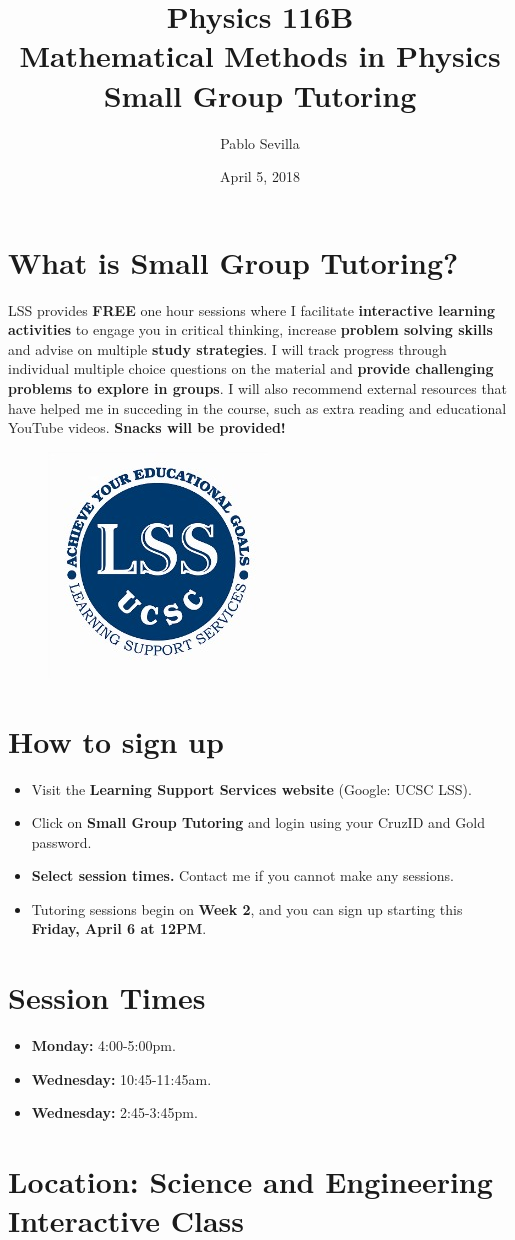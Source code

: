 \documentclass{article}
\title{Physics 116B \\ Mathematical Methods in Physics\\ Small Group Tutoring}
\author{Pablo Sevilla}
\date{April 5, 2018}
\begin{document}
\maketitle
\section{What is Small Group Tutoring?}
LSS provides \textbf{FREE} one hour sessions where I facilitate \textbf{interactive learning activities} to engage you in critical thinking, increase \textbf{problem solving skills} and advise on multiple \textbf{study strategies}. I will track progress through individual multiple choice questions on the material and \textbf{provide challenging problems to explore in groups}. I will also recommend external resources that have helped me in succeding in the course, such as extra reading and educational YouTube videos. \textbf{Snacks will be provided!}
\begin{figure}[h]
\centering
\includegraphics[scale=0.5]{lss}
\end{figure}
\section{How to sign up}
 \begin{itemize}
  \item Visit the \textbf{Learning Support Services website} (Google: UCSC LSS).
  \item Click on \textbf{Small Group Tutoring} and login using your CruzID and Gold password.
  \item \textbf{Select session times.} Contact me if you cannot make any sessions.
  
   \item Tutoring sessions begin   on \textbf{Week 2}, and you can sign up starting this   \textbf{Friday, April 6 at 12PM}.
 \end{itemize}
 \centering
 \section*{Session Times}
 \begin{itemize}
 \centering
     \item \textbf{Monday:} 4:00-5:00pm.
     \item \textbf{Wednesday:} 10:45-11:45am.
     \item \textbf{Wednesday:} 2:45-3:45pm.
 \end{itemize}
 \centering
 \section*{\textbf{Location:} Science and Engineering Interactive Class}
\end{document}
